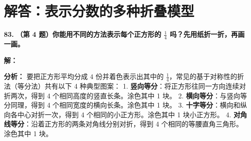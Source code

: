 \newpage



\newpage

\section{解答：表示分数的多种折叠模型}

\vspace{0.6cm}

\textbf{\LARGE 83.} \textbf{（第 4 题）你能用不同的方法表示每个正方形的 $\displaystyle\frac{1}{4}$ 吗？先用纸折一折，再画一画。}

\vspace{0.4cm}
\textbf{解：}

\textbf{分析：}
要把正方形平均分成 $4$ 份并着色表示出其中的 $\displaystyle\frac{1}{4}$，常见的基于对称性的折法（等分法）共有以下 4 种典型图案：
1. \textbf{竖向等分}：将正方形往同一方向连续对折两次，得到 4 个相同高度的竖直长条。涂色其中 1 块。
2. \textbf{横向等分}：与竖向等分同理，得到 4 个相同宽度的横向长条。涂色其中 1 块。
3. \textbf{十字等分}：横向和纵向各中心对折一次，得到 4 个相同的小正方形。涂色其中 1 块小正方形。
4. \textbf{对角线等分}：沿着正方形的两条对角线分别对折，得到 4 个相同的等腰直角三角形。涂色其中 1 块。

